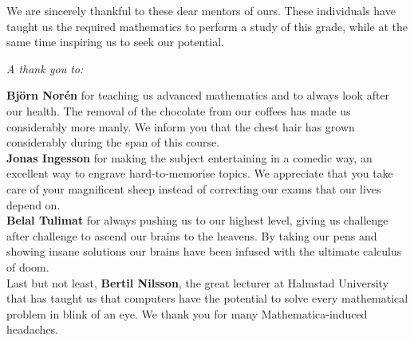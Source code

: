 \documentclass[main.tex]{subfiles}
\begin{document}
We are sincerely thankful to these dear mentors of ours. These individuals have
taught us the required mathematics to perform a study of this grade, while at
the same time inspiring us to seek our potential. \\

\begin{center}
  \emph{A thank you to:} \\
\end{center}

\textbf{Björn Norén} for teaching us advanced mathematics and to always look
after our health. The removal of the chocolate from our coffees has made us
considerably more manly. We inform you that the chest
hair has grown considerably during the span of this course. \\

\textbf{Jonas Ingesson} for making the subject entertaining in a comedic way, an
excellent way to engrave hard-to-memorise topics. We appreciate that you take
care of your magnificent sheep instead of correcting our exams
that our lives depend on. \\

\textbf{Belal Tulimat} for always pushing us to our highest level, giving us
challenge after challenge to ascend our brains to the heavens. By taking our
pens and showing insane solutions our brains have been infused with the ultimate
calculus of doom. \\

Last but not least, \textbf{Bertil Nilsson}, the great lecturer at Halmstad
University that has taught us that computers have the potential to solve
every mathematical problem in blink of an eye. We thank you for many
Mathematica-induced headaches.\\
\end{document}

